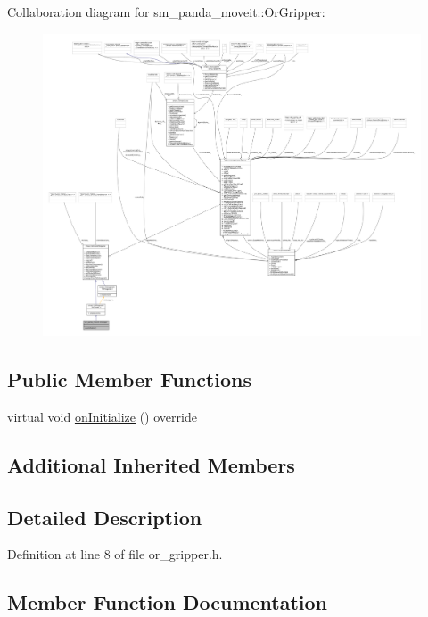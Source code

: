 Collaboration diagram for sm\+\_\+panda\+\_\+moveit\+:\+:Or\+Gripper\+:
\nopagebreak
\begin{figure}[H]
\begin{center}
\leavevmode
\includegraphics[width=350pt]{classsm__panda__moveit_1_1OrGripper__coll__graph}
\end{center}
\end{figure}
\subsection*{Public Member Functions}
\begin{DoxyCompactItemize}
\item 
virtual void \hyperlink{classsm__panda__moveit_1_1OrGripper_a0e0ae666aacbcae331720f7bc93f8f14}{on\+Initialize} () override
\end{DoxyCompactItemize}
\subsection*{Additional Inherited Members}


\subsection{Detailed Description}


Definition at line 8 of file or\+\_\+gripper.\+h.



\subsection{Member Function Documentation}
\mbox{\label{classsm__panda__moveit_1_1OrGripper_a0e0ae666aacbcae331720f7bc93f8f14}} 
